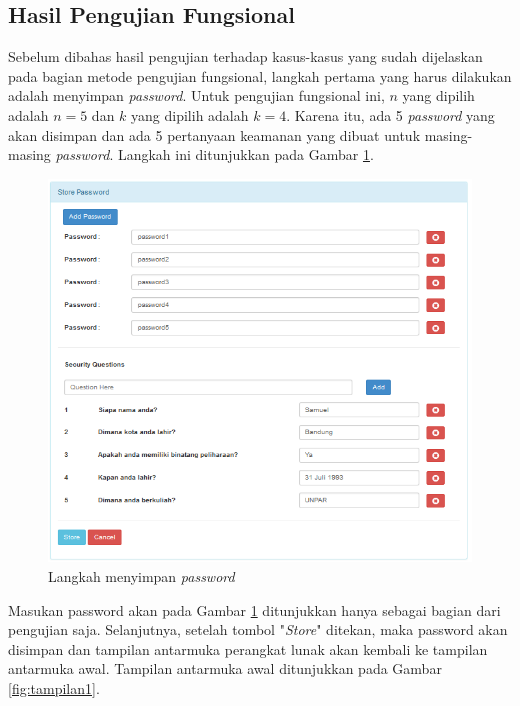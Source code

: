 \subsection{Hasil Pengujian Fungsional}\label{subsec:hasil_pengujian_fungsional}

Sebelum dibahas hasil pengujian terhadap kasus-kasus yang sudah dijelaskan pada bagian metode pengujian fungsional, langkah pertama yang harus dilakukan adalah menyimpan \textit{password}. Untuk pengujian fungsional ini, $n$ yang dipilih adalah $n=5$ dan $k$ yang dipilih adalah $k=4$. Karena itu, ada 5 \textit{password} yang akan disimpan dan ada 5 pertanyaan keamanan yang dibuat untuk masing-masing \textit{password}. Langkah ini ditunjukkan pada Gambar \ref{fig:simpan_password}.

\begin{figure}[H]
	\includegraphics[scale=0.8]{Gambar/simpan_password}
	\centering
	\caption{Langkah menyimpan \textit{password}}\label{fig:simpan_password}
\end{figure}

Masukan password akan pada Gambar \ref{fig:simpan_password} ditunjukkan hanya sebagai bagian dari pengujian saja. Selanjutnya, setelah tombol "\textit{Store}" ditekan, maka password akan disimpan dan tampilan antarmuka perangkat lunak akan kembali ke tampilan antarmuka awal. Tampilan antarmuka awal ditunjukkan pada Gambar \ref{fig:tampilan1}.

